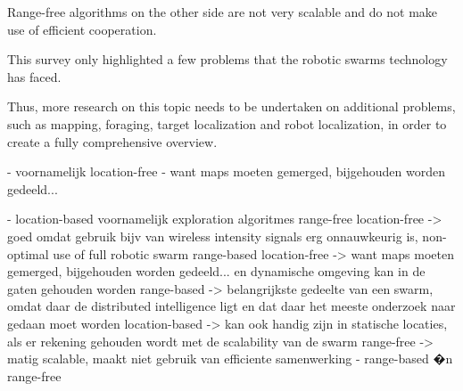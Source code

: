 Range-free algorithms on the other side are not very scalable and do not make use of efficient cooperation.

This survey only highlighted a few problems that the robotic swarms technology has faced. 

Thus, more research on this topic needs to be undertaken on additional problems, such as mapping, foraging, target localization and robot localization, in order to create a fully comprehensive overview.

- voornamelijk location-free
    - want maps moeten gemerged, bijgehouden worden gedeeld...

- location-based voornamelijk exploration algoritmes
    range-free location-free -> goed omdat gebruik bijv van wireless intensity signals erg onnauwkeurig is, non-optimal use of full robotic swarm
    range-based location-free -> want maps moeten gemerged, bijgehouden worden gedeeld... en dynamische omgeving kan in de gaten gehouden worden
    range-based -> belangrijkste gedeelte van een swarm, omdat daar de distributed intelligence ligt en dat daar het meeste onderzoek naar gedaan moet worden
    location-based -> kan ook handig zijn in statische locaties, als er rekening gehouden wordt met de scalability van de swarm  
    range-free -> matig scalable, maakt niet gebruik van efficiente samenwerking
- range-based �n range-free
